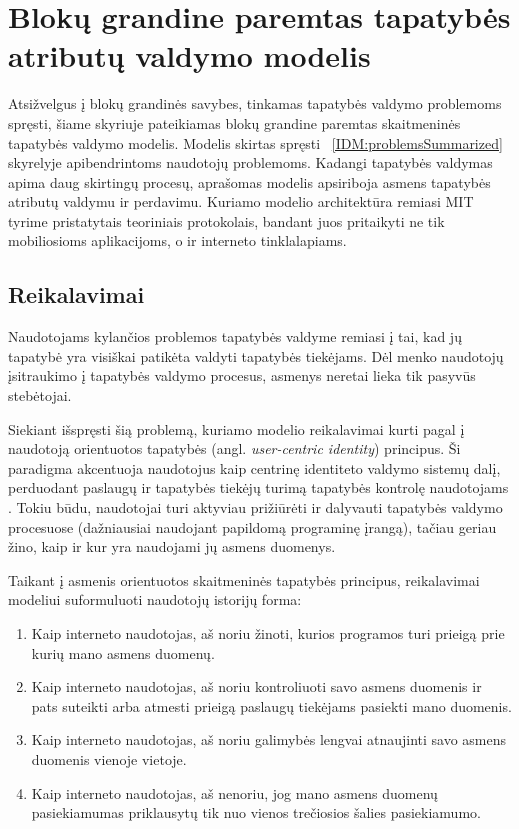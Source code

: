 \section{Blokų grandine paremtas tapatybės atributų valdymo modelis}

Atsižvelgus į blokų grandinės savybes, tinkamas tapatybės valdymo problemoms spręsti, šiame skyriuje pateikiamas
blokų grandine paremtas skaitmeninės tapatybės valdymo modelis. Modelis skirtas spręsti ~\ref{IDM:problemsSummarized} skyrelyje
apibendrintoms naudotojų problemoms. Kadangi tapatybės valdymas apima
daug skirtingų procesų, aprašomas modelis apsiriboja asmens tapatybės atributų valdymu ir perdavimu. Kuriamo modelio architektūra 
remiasi MIT tyrime \cite{MITPaper} pristatytais teoriniais protokolais, bandant juos pritaikyti
ne tik mobiliosioms aplikacijoms, o ir interneto tinklalapiams. 

\subsection{Reikalavimai}

Naudotojams kylančios problemos tapatybės valdyme remiasi į tai, kad jų tapatybė yra
visiškai patikėta valdyti tapatybės tiekėjams. Dėl menko naudotojų įsitraukimo į tapatybės valdymo
procesus, asmenys neretai lieka tik pasyvūs stebėtojai.


Siekiant išspręsti šią problemą, kuriamo modelio reikalavimai kurti pagal į naudotoją orientuotos tapatybės
(angl. \textit{user-centric identity}) principus. Ši paradigma akcentuoja naudotojus kaip centrinę
identiteto valdymo sistemų dalį, perduodant paslaugų ir tapatybės tiekėjų turimą tapatybės kontrolę
naudotojams \cite{Cao2010}. Tokiu būdu, naudotojai turi aktyviau prižiūrėti ir dalyvauti tapatybės
valdymo procesuose (dažniausiai naudojant papildomą programinę įrangą),
tačiau geriau žino, kaip ir kur yra naudojami jų asmens duomenys.

Taikant į asmenis orientuotos skaitmeninės tapatybės principus, reikalavimai modeliui suformuluoti naudotojų istorijų forma:

\begin{enumerate}
    \item Kaip interneto naudotojas, aš noriu žinoti, kurios programos turi prieigą prie kurių mano asmens duomenų.
    \item Kaip interneto naudotojas, aš noriu kontroliuoti savo asmens duomenis ir pats suteikti arba atmesti prieigą paslaugų tiekėjams pasiekti mano duomenis.
    \item Kaip interneto naudotojas, aš noriu galimybės lengvai atnaujinti savo asmens duomenis vienoje vietoje.
    \item Kaip interneto naudotojas, aš nenoriu, jog mano asmens duomenų pasiekiamumas priklausytų tik nuo vienos trečiosios šalies pasiekiamumo.
\end{enumerate}

